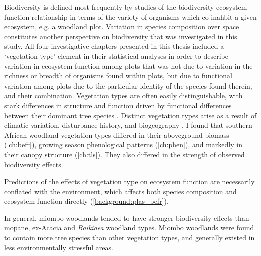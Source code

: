 \begin{refsection}
Biodiversity is defined most frequently by studies of the biodiversity-ecosystem function relationship in terms of the variety of organisms which co-inahbit a given ecosystem, e.g. a woodland plot. Variation in species composition over space constitutes another perspective on biodiversity that was investigated in this study. All four investigative chapters presented in this thesis included a `vegetation type' element in their statistical analyses in order to describe variation in ecosystem function among plots that was not due to variation in the richness or breadth of organisms found within plots, but due to functional variation among plots due to the particular identity of the species found therein, and their combination. Vegetation types are often easily distinguishable, with stark differences in structure and function driven by functional differences between their dominant tree species \citep{Solbrig1996}. Distinct vegetation types arise as a result of climatic variation, disturbance history, and biogeography \citep{}. I found that southern African woodland vegetation types differed in their aboveground biomass (\autoref{ch:befr}), growing season phenological patterns (\autoref{ch:phen}), and markedly in their canopy structure (\autoref{ch:tls}). They also differed in the strength of observed biodiversity effects. 

Predictions of the effects of vegetation type on ecosystem function are necessarily conflated with the environment, which affects both species composition and ecosystem function directly (\autoref{background:plas_befr}). 

In general, miombo woodlands tended to have stronger biodiversity effects than mopane, ex-Acacia and \textit{Baikiaea} woodland types. Miombo woodlands were found to contain more tree species than other vegetation types, and generally existed in less environmentally stressful areas. 


\end{refsection}
